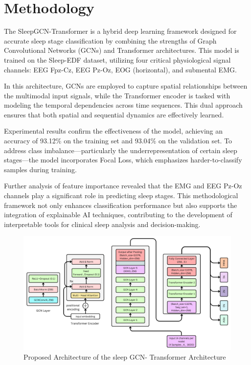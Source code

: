 
\section{Methodology}



The SleepGCN-Transformer is a hybrid deep learning framework designed for accurate sleep stage classification by combining the strengths of Graph Convolutional Networks (GCNs) and Transformer architectures. This model is trained on the Sleep-EDF dataset, utilizing four critical physiological signal channels: EEG Fpz-Cz, EEG Pz-Oz, EOG (horizontal), and submental EMG.

In this architecture, GCNs are employed to capture spatial relationships between the multimodal input signals, while the Transformer encoder is tasked with modeling the temporal dependencies across time sequences. This dual approach ensures that both spatial and sequential dynamics are effectively learned.

Experimental results confirm the effectiveness of the model, achieving an accuracy of 93.12\% on the training set and 93.04\% on the validation set. To address class imbalance—particularly the underrepresentation of certain sleep stages—the model incorporates Focal Loss, which emphasizes harder-to-classify samples during training.

Further analysis of feature importance revealed that the EMG and EEG Pz-Oz channels play a significant role in predicting sleep stages. This methodological framework not only enhances classification performance but also supports the integration of explainable AI techniques, contributing to the development of interpretable tools for clinical sleep analysis and decision-making.

\begin{figure}
	\centering
	\includegraphics[width=.9\linewidth]{"img/paper_3/Graph Convolution Neural Network -SleepGCN_Transformer Architechture"}
	\caption{Proposed Architecture of the sleep GCN- Transformer Architecture}
	\label{fig:graph-convolution-neural-network--sleepgcntransformer-architechture}
\end{figure}



